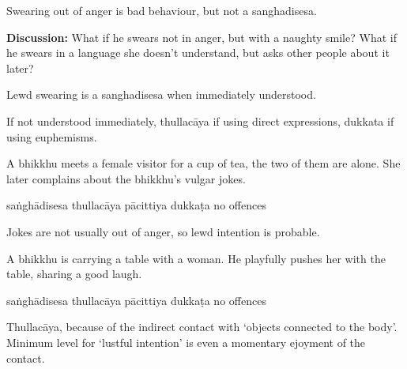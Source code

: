 \begin{exam}{\autoExamName}
\begin{problem*}
\begin{parts}
    \begin{solution}
      Swearing out of anger is bad behaviour, but not a sanghadisesa.
    \end{solution}

    \bigskip

    \textbf{Discussion:} What if he swears not in anger, but with a naughty
    smile? What if he swears in a language she doesn't understand, but asks
    other people about it later?

    \begin{solution}
      Lewd swearing is a sanghadisesa when immediately understood.

      If not understood immediately, thullacāya if using direct expressions, dukkata if using euphemisms.
    \end{solution}

    \bigskip

  \item A bhikkhu meets a female visitor for a cup of tea, the two of them are alone.
    She later complains about the bhikkhu's vulgar jokes.

    \bigskip

    \begin{answers}{5}
      \bChoices
       saṅghādisesa\eAns
       thullacāya\eAns
       pācittiya\eAns
       dukkaṭa\eAns
       no offences\eAns
      \eChoices
    \end{answers}

    \begin{solution}
      Jokes are not usually out of anger, so lewd intention is probable.
    \end{solution}

    \bigskip

  \item A bhikkhu is carrying a table with a woman. He playfully pushes her
    with the table, sharing a good laugh.

    \bigskip

    \begin{answers}{5}
      \bChoices
       saṅghādisesa\eAns
       thullacāya\eAns
       pācittiya\eAns
       dukkaṭa\eAns
       no offences\eAns
      \eChoices
    \end{answers}

    \begin{solution}
      Thullacāya, because of the indirect contact with `objects connected to the body'.
      Minimum level for `lustful intention' is even a momentary ejoyment of the contact.
    \end{solution}


\end{parts}
\end{problem*}
\end{exam}
